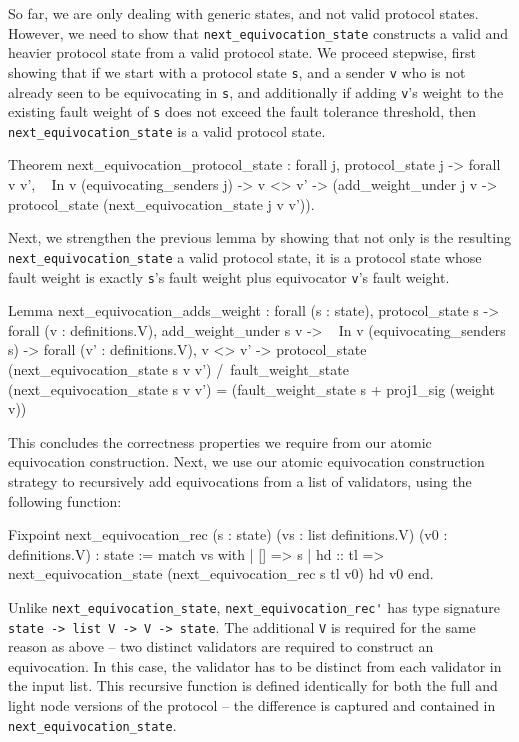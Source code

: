 \documentclass[runningheads]{llncs}
\begin{document}
So far, we are only dealing with generic states, and not valid protocol states. However, we need to show that \verb|next_equivocation_state| constructs a valid and heavier protocol state from a valid protocol state. We proceed stepwise, first showing that if we start with a protocol state \verb|s|, and a sender \verb|v| who is not already seen to be equivocating in \verb|s|, and additionally if adding \verb|v|'s weight to the existing fault weight of \verb|s| does not exceed the fault tolerance threshold, then \verb|next_equivocation_state| is a valid protocol state.
\begin{coq}
Theorem next_equivocation_protocol_state :
	forall j,
	protocol_state j ->
	forall v v',
	~ In v (equivocating_senders j) ->
	v <> v' ->
	(add_weight_under j v ->
	protocol_state (next_equivocation_state j v v')).
\end{coq} 	
Next, we strengthen the previous lemma by showing that not only is the resulting \verb|next_equivocation_state| a valid protocol state, it is a protocol state whose fault weight is exactly \verb|s|'s fault weight plus equivocator \verb|v|'s fault weight.
\begin{coq}
	Lemma next_equivocation_adds_weight :
	forall (s : state),
	protocol_state s ->
	forall (v : definitions.V),
	add_weight_under s v ->
	~ In v (equivocating_senders s) ->
	forall (v' : definitions.V),
	v <> v' ->
	protocol_state (next_equivocation_state s v v') /\
	fault_weight_state (next_equivocation_state s v v') =
	(fault_weight_state s + proj1_sig (weight v))%
\end{coq}	
This concludes the correctness properties we require from our atomic equivocation construction. Next, we use our atomic equivocation construction strategy to recursively add equivocations from a list of validators, using the following function:
\begin{coq}
Fixpoint next_equivocation_rec (s : state)
															(vs : list definitions.V)
															(v0 : definitions.V) : state :=
	match vs with
	| [] => s
	| hd :: tl => next_equivocation_state (next_equivocation_rec s tl v0)
																				hd
																				v0
	end.
\end{coq}
Unlike \verb|next_equivocation_state|, \verb|next_equivocation_rec'| has type signature \verb|state -> list V -> V -> state|. The additional \verb|V| is required for the same reason as above -- two distinct validators are required to construct an equivocation. In this case, the validator has to be distinct from each validator in the input list. This recursive function is defined identically for both the full and light node versions of the protocol -- the difference is captured and contained in \verb|next_equivocation_state|.
\end{document}
